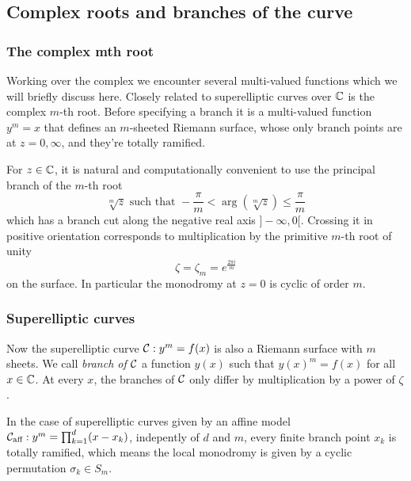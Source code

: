 \documentclass[main.tex]{subfiles}
\begin{document}
   

  
  \subsection{Complex roots and branches of the curve}\label{subsec:roots_branches}

  \subsubsection{The complex mth root}

  Working over the complex we encounter several multi-valued functions
  which we will briefly discuss here.  Closely related to superelliptic
  curves over $\mathbb{C}$ is the complex $m$-th root.
  Before specifying a branch it is a multi-valued function $y^m = x$
  that defines an $m$-sheeted Riemann surface, whose only branch points
  are at $z = 0,\infty$, and they're totally ramified.

  For $z\in\mathbb{C}$, it is natural and computationally convenient to use the
  principal branch of the $m$-th root
  \begin{equation}
      \sqrt[m]z \text{ such that } -\frac{π}m<\arg(\sqrt[m]z)\leq\frac{π}m
  \end{equation}
  which has a branch cut along the negative real axis $]\!-\infty,0[$.
  Crossing it in positive orientation corresponds to multiplication by
  the primitive $m$-th root of unity
  \begin{equation}
  \zeta = \zeta_m = e^{\frac{2\pi i }{m}}    
  \end{equation}
  on the surface. In
  particular the monodromy at $z=0$ is cyclic of order $m$.

  \subsubsection{Superelliptic curves}

  Now the superelliptic curve $\mathcal{C}:y^m=f(x)$ is also a Riemann surface with
  $m$ sheets.
  We call \emph{branch of $\mathcal{C}$} a function $y(x)$ such that
  $y(x)^m = f(x)$ for all $x \in \mathbb{C}$. At every $x$, the branches of $\mathcal{C}$ only
  differ by multiplication by a power of $\zeta$.
  

  In the case of superelliptic curves given
  by an affine model $\mathcal{C}_{\text{aff}} : y^m = \prod_{k = 1}^d (x - x_k)$, indepently of
  $d$ and $m$, every finite branch point $x_k$ is totally ramified, which means
  the local monodromy is given by a cyclic permutation $\sigma_k \in S_m$.
  
\end{document}
